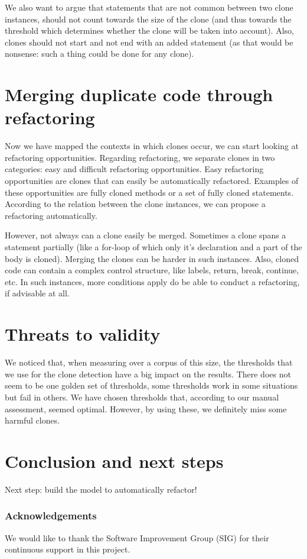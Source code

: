 \documentclass[a4paper]{article}
\begin{document}
We also want to argue that statements that are not common between two clone instances, should not count towards the size of the clone (and thus towards the threshold which determines whether the clone will be taken into account). Also, clones should not start and not end with an added statement (as that would be nonsense: such a thing could be done for any clone).


\section{Merging duplicate code through refactoring}
Now we have mapped the contexts in which clones occur, we can start looking at refactoring opportunities. Regarding refactoring, we separate clones in two categories: easy and difficult refactoring opportunities. Easy refactoring opportunities are clones that can easily be automatically refactored. Examples of these opportunities are fully cloned methods or a set of fully cloned statements. According to the relation between the clone instances, we can propose a refactoring automatically.

However, not always can a clone easily be merged. Sometimes a clone spans a statement partially (like a for-loop of which only it's declaration and a part of the body is cloned). Merging the clones can be harder in such instances. Also, cloned code can contain a complex control structure, like labels, return, break, continue, etc. In such instances, more conditions apply do be able to conduct a refactoring, if advisable at all.


\section{Threats to validity}
We noticed that, when measuring over a corpus of this size, the thresholds that we use for the clone detection have a big impact on the results. There does not seem to be one golden set of thresholds, some thresholds work in some situations but fail in others. We have chosen thresholds that, according to our manual assessment, seemed optimal. However, by using these, we definitely miss some harmful clones.

\section{Conclusion and next steps}
Next step: build the model to automatically refactor!


\subsubsection{Acknowledgements}
We would like to thank the Software Improvement Group (SIG) for their continuous support in this project.






\end{document}
